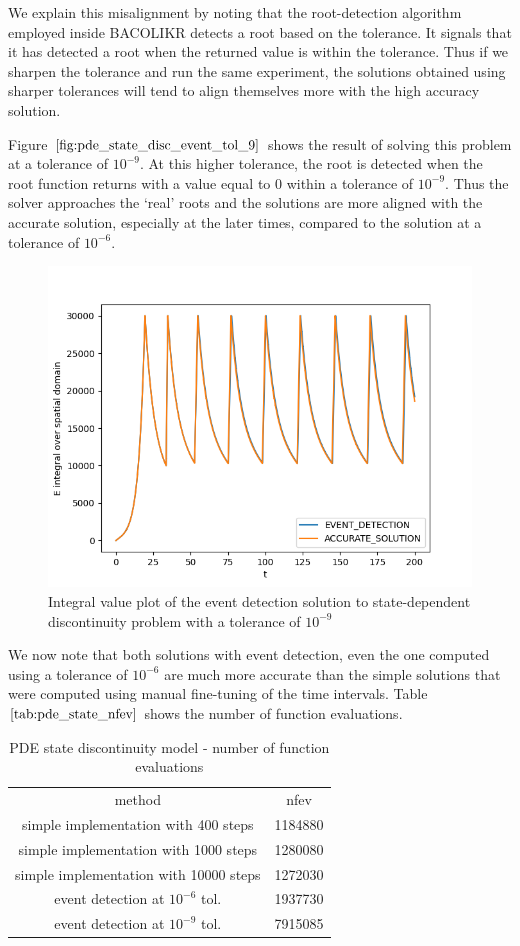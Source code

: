 \documentclass{article}
\begin{document}
We explain this misalignment by noting that the root-detection algorithm employed inside BACOLIKR detects a root based on the tolerance. It signals that it has detected a root when the returned value is within the tolerance. Thus if we sharpen the tolerance and run the same experiment, the solutions obtained using sharper tolerances will tend to align themselves more with the high accuracy solution.

Figure $\ref{fig:pde_state_disc_event_tol_9}$ shows the result of solving this problem at a tolerance of $10^{-9}$. At this higher tolerance, the root is detected when the root function returns with a value equal to 0 within a tolerance of $10^{-9}$. Thus the solver approaches the `real' roots and the solutions are more aligned with the accurate solution, especially at the later times, compared to the solution at a tolerance of $10^{-6}$.


\begin{figure}[H]
\centering
\includegraphics[width=0.7\linewidth]{./figures/pde_state_disc_event_tol_9}
\caption{Integral value plot of the event detection solution to state-dependent discontinuity problem with a tolerance of $10^{-9}$}
\label{fig:pde_state_disc_event_tol_9}
\end{figure}

We now note that both solutions with event detection, even the one computed using a tolerance of $10^{-6}$ are much more accurate than the simple solutions that were computed using manual fine-tuning of the time intervals. Table $\ref{tab:pde_state_nfev}$ shows the number of function evaluations. 

\begin{table}[h]
\caption {PDE state discontinuity model - number of function evaluations} 
\label{tab:pde_state_nfev}
\begin{center}
\begin{tabular}{ c c } 
method & nfev \\ 
simple implementation with 400 steps   & 1184880 \\
simple implementation with 1000 steps  & 1280080 \\
simple implementation with 10000 steps & 1272030 \\
event detection at $10^{-6}$ tol.     & 1937730 \\
event detection at $10^{-9}$ tol.     & 7915085 \\
\end{tabular}
\end{center}
\end{table}
\end{document}
